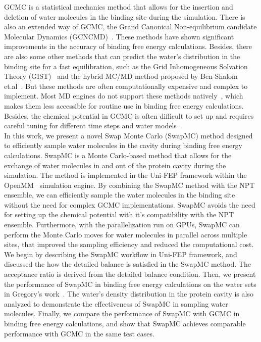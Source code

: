 \documentclass[journal=jacsat,manuscript=article]{achemso}
\begin{document}
GCMC is a statistical mechanics method that allows for the insertion and deletion of water molecules in the binding site during the simulation.
There is also an extended way of GCMC, the Grand Canonical Non-equilibrium candidate Molecular Dynamics (GCNCMD)~\cite{Bergazin2020,Ge2022,melling2023enhanced,Deng2024}.
These methods have shown significant improvements in the accuracy of binding free energy calculations.
Besides, there are also some other methods that can predict the water's distribution in the binding site for a fast equilibration, 
such as the Grid Inhomogeneous Solvation Theory (GIST)~\cite{Abel2008,Michel2009,Cao2019,Irwin2019,Eberhardt2023} and the hybrid MC/MD method proposed by Ben-Shalom et.al~\cite{ben2021fast}.
But these methods are often computationally expensive and complex to implement. 
Most MD engines do not support these methods natively~\cite{Samways2020,Cezar2020,Nejahi2021,Nejahi2019}, which makes them less accessible for routine use in binding free energy calculations.
Besides, the chemical potential in GCMC is often difficult to set up and requires careful tuning for different time steps and water models~\cite{deng2008computation,ross2020enhancing}.\\
\newline
In this work, we present a novel Swap Monte Carlo (SwapMC) method designed to efficiently sample water molecules in the cavity during binding free energy calculations.
SwapMC is a Monte Carlo-based method that allows for the exchange of water molecules in and out of the protein cavity during the simulation.
The method is implemented in the Uni-FEP framework within the OpenMM~\cite{Eastman2023} simulation engine.
By combining the SwapMC method with the NPT ensemble, we can efficiently sample the water molecules in the binding site without the need for complex GCMC implementations.
SwapMC avoids the need for setting up the chemical potential with it's compatibility with the NPT ensemble.
Furthermore, with the parallelization run on GPUs, SwapMC can perform the Monte Carlo moves for water molecules in parallel across multiple sites, 
that improved the sampling efficiency and reduced the computational cost. \\
\newline
We begin by describing the SwapMC workflow in Uni-FEP framework, 
and discussed the how the detailed balance is satisfied in the SwapMC method.
The acceptance ratio is derived from the detailed balance condition.
Then, we present the performance of SwapMC in binding free energy calculations on the water sets in Gregory's work~\cite{ross2020enhancing}.
The water's density distribution in the protein cavity is also analyzed to demonstrate the effectiveness of SwapMC in sampling water molecules.
Finally, we compare the performance of SwapMC with GCMC in binding free energy calculations,
and show that SwapMC achieves comparable performance with GCMC in the same test cases.
\end{document}
